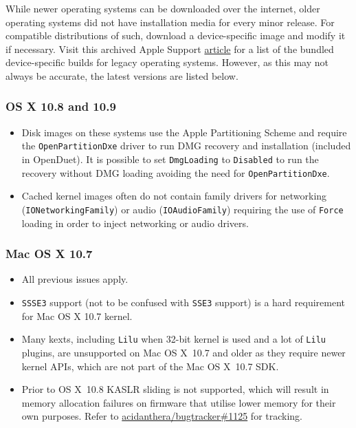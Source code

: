\documentclass[]{article}
\begin{document}
While newer operating systems can be downloaded over the internet,
older operating systems did not have installation media for every minor
release. For compatible distributions of such, download a device-specific
image and modify it if necessary. Visit this archived Apple Support
\href{https://web.archive.org/web/20170705003629/https://support.apple.com/en-us/HT204319}{article}
for a list of the bundled device-specific builds for legacy operating systems.
However, as this may not always be accurate, the latest versions are listed below.

\subsubsection{OS X 10.8 and 10.9}\label{legacy108}

\begin{itemize}
  \item Disk images on these systems use the Apple Partitioning Scheme
    and require the \texttt{OpenPartitionDxe} driver to run DMG recovery
    and installation (included in OpenDuet). It is possible to set
    \texttt{DmgLoading} to \texttt{Disabled} to run the recovery
    without DMG loading avoiding the need for \texttt{OpenPartitionDxe}.
  \item Cached kernel images often do not contain family drivers
    for networking (\texttt{IONetworkingFamily}) or audio
    (\texttt{IOAudioFamily}) requiring the use of \texttt{Force}
    loading in order to inject networking or audio drivers.
\end{itemize}

\subsubsection{Mac OS X 10.7}\label{legacy107}

\begin{itemize}
  \item All previous issues apply.
  \item \texttt{SSSE3} support (not to be confused with \texttt{SSE3} support)
    is a hard requirement for Mac OS X 10.7 kernel.
  \item Many kexts, including \texttt{Lilu} when 32-bit kernel
    is used and a lot of \texttt{Lilu} plugins, are
    unsupported on Mac OS X~10.7 and older as they require newer
    kernel APIs, which are not part of the Mac OS X~10.7 SDK.
  \item Prior to OS X~10.8 KASLR sliding is not supported, which
    will result in memory allocation failures on firmware
    that utilise lower memory for their own purposes. Refer to
    \href{https://github.com/acidanthera/bugtracker/issues/1125}{acidanthera/bugtracker\#1125}
    for tracking.
\end{itemize}
\end{document}
